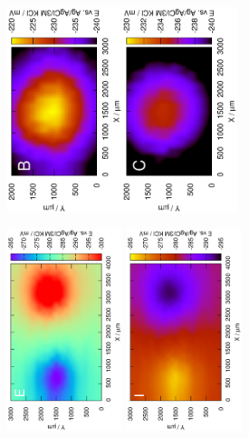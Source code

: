 \begin{figure}
\includegraphics[width=0.3\textwidth, angle=-90]{img/mérések/Zn_h_100.eps}\includegraphics[width=0.3\textwidth, angle=-90]{img/mérések/Zn_h_500.eps}

\includegraphics[width=0.3\textwidth, angle=-90]{img/mérések/grafit_h1_100.eps}
\includegraphics[width=0.3\textwidth, angle=-90]{img/mérések/grafit_h_300.eps}


\end{figure}
